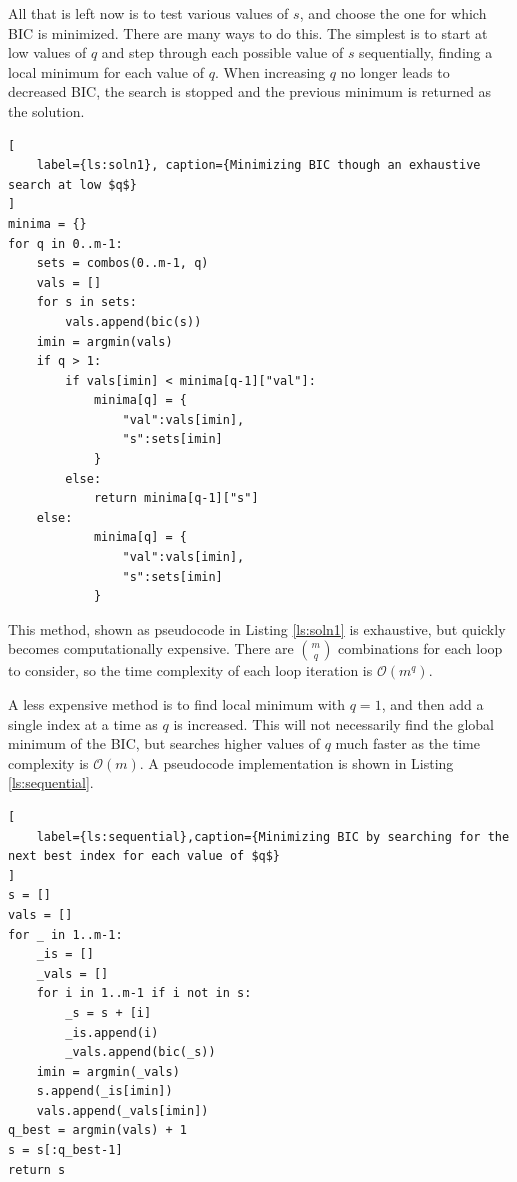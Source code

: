 \documentclass[twocolumn,linenumbers]{aastex7}
\begin{document}
All that is left now is to test various values of $s$, and choose the one for which BIC is minimized. There are many ways to do this. The simplest is to start at low values of $q$ and step through each possible value of $s$ sequentially, finding a local minimum for each value of $q$. When increasing $q$ no longer leads to decreased BIC, the search is stopped and the previous minimum is returned as the solution.
\begin{center}
\begin{lstlisting}[
    label={ls:soln1}, caption={Minimizing BIC though an exhaustive search at low $q$}
]
minima = {}
for q in 0..m-1:
    sets = combos(0..m-1, q)
    vals = []
    for s in sets:
        vals.append(bic(s))
    imin = argmin(vals)
    if q > 1:
        if vals[imin] < minima[q-1]["val"]:
            minima[q] = {
                "val":vals[imin],
                "s":sets[imin]
            }
        else:
            return minima[q-1]["s"]
    else:
            minima[q] = {
                "val":vals[imin],
                "s":sets[imin]
            }
\end{lstlisting}
\end{center}

This method, shown as pseudocode in Listing \ref{ls:soln1} is exhaustive, but quickly becomes computationally expensive. There are $m\choose q$ combinations for each loop to consider, so the time complexity of each loop iteration is $\mathcal{O}(m^q)$.

A less expensive method is to find local minimum with $q=1$, and then add a single index at a time as $q$ is increased. This will not necessarily find the global minimum of the BIC, but searches higher values of $q$ much faster as the time complexity is $\mathcal{O}(m)$. A pseudocode implementation is shown in Listing \ref{ls:sequential}.

\begin{center}
\begin{lstlisting}[
    label={ls:sequential},caption={Minimizing BIC by searching for the next best index for each value of $q$}
]
s = []
vals = []
for _ in 1..m-1:
    _is = []
    _vals = []
    for i in 1..m-1 if i not in s:
        _s = s + [i]
        _is.append(i)
        _vals.append(bic(_s))
    imin = argmin(_vals)
    s.append(_is[imin])
    vals.append(_vals[imin])
q_best = argmin(vals) + 1
s = s[:q_best-1]
return s
\end{lstlisting}
\end{center}



\end{document}
